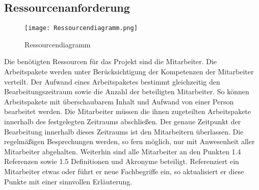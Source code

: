 \subsection{Ressourcenanforderung}

\begin{figure}[H]
\centering
\texttt{[image: Ressourcendiagramm.png]}
\caption{Ressourcendiagramm}
\end{figure}

Die benötigten Ressourcen für das Projekt sind die Mitarbeiter. Die Arbeitspakete werden unter Berücksichtigung der Kompetenzen der Mitarbeiter verteilt.
\newline Der Aufwand eines Arbeitspaketes bestimmt gleichzeitig den Bearbeitungszeitraum sowie die Anzahl der beteiligten Mitarbeiter. So können Arbeitspakete mit überschaubarem Inhalt und Aufwand von einer Person bearbeitet werden.
\newline Die Mitarbeiter müssen die ihnen zugeteilten Arbeitspakete innerhalb des festgelegten Zeitraums abschließen. Der genaue Zeitpunkt der Bearbeitung innerhalb dieses Zeitraums ist den Mitarbeitern überlassen.
\newline Die regelmäßigen Besprechungen werden, so fern möglich, nur mit Anwesenheit aller Mitarbeiter abgehalten. Weiterhin sind alle Mitarbeiter an den Punkten 1.4 Referenzen sowie 1.5 Definitionen und Akronyme beteiligt. Referenziert ein Mitarbeiter etwas oder führt er neue Fachbegriffe ein, so aktualisiert er diese Punkte mit einer sinnvollen Erläuterung.

